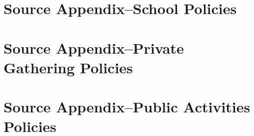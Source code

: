\documentclass[11pt, a4paper, leqno]{article}
\begin{document}
\section*{Source Appendix--School Policies} %
\label{sec:source appendix school policies}




\clearpage

\section*{Source Appendix--Private Gathering Policies} %
\label{sec:source appendix private gathering policies}




\clearpage

\section*{Source Appendix--Public Activities Policies} %
\label{sec:source appendix public activities policies}





\end{document}
